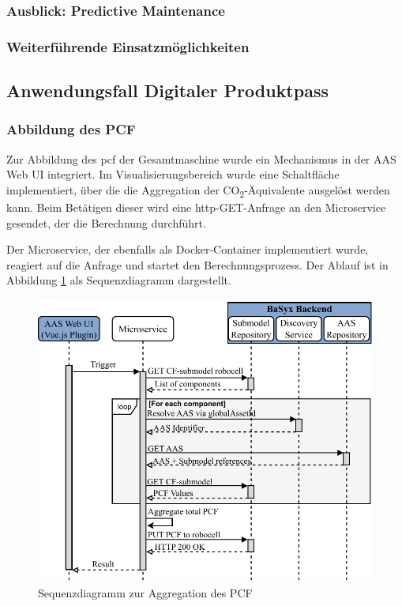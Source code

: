 \subsubsection{Ausblick: Predictive Maintenance}
\subsubsection{Weiterführende Einsatzmöglichkeiten}

\newpage
\subsection{Anwendungsfall Digitaler Produktpass}
\subsubsection{Abbildung des PCF}
Zur Abbildung des \acs{pcf} der Gesamtmaschine wurde ein Mechanismus in der AAS Web UI integriert. 
Im Visualisierungsbereich wurde eine Schaltfläche implementiert, über die die Aggregation der CO\textsubscript{2}-Äquivalente ausgelöst werden kann. 
Beim Betätigen dieser wird eine \acs{http}-GET-Anfrage an den Microservice gesendet, der die Berechnung durchführt.

Der Microservice, der ebenfalls als Docker-Container implementiert wurde, reagiert auf die Anfrage und startet den Berechnungsprozess. 
Der Ablauf ist in Abbildung \ref{fig:SequenzdiagrammPCF} als Sequenzdiagramm dargestellt.

\begin{figure}[htbp]
    \centering
        \includegraphics[width=1\textwidth]{Bilder/Ergebnisse/DPP/AggregationNue.pdf}
    \caption{Sequenzdiagramm zur Aggregation des PCF}
    \label{fig:SequenzdiagrammPCF}
\end{figure}

